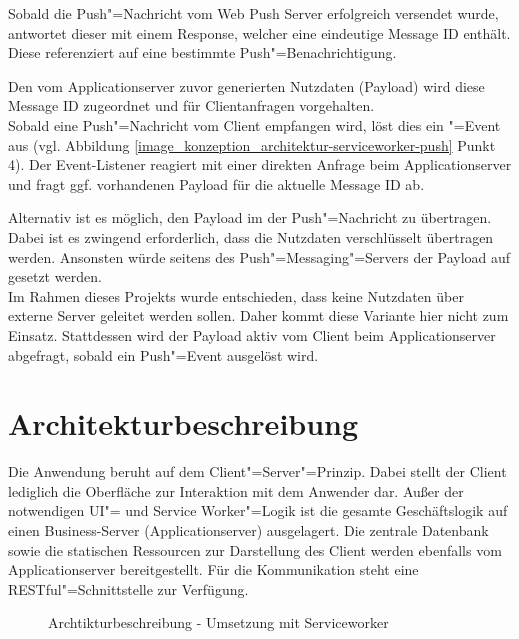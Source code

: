 Sobald die Push"=Nachricht vom Web Push Server erfolgreich versendet wurde, antwortet dieser mit einem Response, welcher eine eindeutige Message ID enthält. Diese referenziert auf eine bestimmte Push"=Benachrichtigung.

Den vom Applicationserver zuvor generierten Nutzdaten (Payload) wird diese Message ID zugeordnet und für Clientanfragen vorgehalten. \\
Sobald eine Push"=Nachricht vom Client empfangen wird, löst dies ein "=Event aus (vgl. Abbildung \ref{image_konzeption_architektur-serviceworker-push} Punkt 4). Der Event-Listener reagiert mit einer direkten Anfrage beim Applicationserver und fragt ggf. vorhandenen Payload für die aktuelle Message ID ab.

Alternativ ist es möglich, den Payload im  der Push"=Nachricht zu übertragen. Dabei ist es zwingend erforderlich, dass die Nutzdaten verschlüsselt übertragen werden. Ansonsten würde seitens des Push"=Messaging"=Servers der Payload auf  gesetzt werden. \\
Im Rahmen dieses Projekts wurde entschieden, dass keine Nutzdaten über \glqq externe\grqq{} Server geleitet werden sollen. Daher kommt diese Variante hier nicht zum Einsatz. Stattdessen wird der Payload aktiv vom Client beim Applicationserver abgefragt, sobald ein Push"=Event ausgelöst wird. 

\section{Architekturbeschreibung}
\label{sec_konzeption_serviceworker_architektur}

Die Anwendung beruht auf dem Client"=Server"=Prinzip. Dabei stellt der Client lediglich die Oberfläche zur Interaktion mit dem Anwender dar. Außer der notwendigen UI"= und Service Worker"=Logik ist die gesamte Geschäftslogik auf einen Business-Server (Applicationserver) ausgelagert. Die zentrale Datenbank sowie die statischen Ressourcen zur Darstellung des Client werden ebenfalls vom Applicationserver bereitgestellt. Für die Kommunikation steht eine RESTful"=Schnittstelle zur Verfügung.

\begin{figure}[htp] 
\caption{Archtikturbeschreibung - Umsetzung mit Serviceworker}
\label{image_architektur-serviceworker-push}
\end{figure} 

